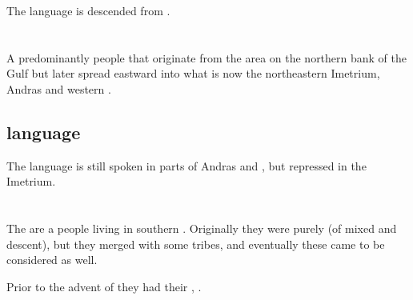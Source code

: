 The \Ortic{} language is descended from .















\section{\Samur}
\index{\Samur}
A predominantly \scathaese{} people that originate from the area on the northern bank of the \Samure{} Gulf but later spread eastward into what is now the northeastern Imetrium, Andras and western . 









\subsection{\Samurin{} language}
The \Samurin{} language is still spoken in parts of Andras and , but repressed in the Imetrium. 















\section{\Tepharites}
\index{\Tepharite}
The \Tepharites{} are a people living in southern . 
Originally they were purely \scathae{} (of mixed  and  descent), but they merged with some \human{} tribes, and eventually these came to be considered \Tepharites{} as well. 

Prior to the advent of  they had their , . 

